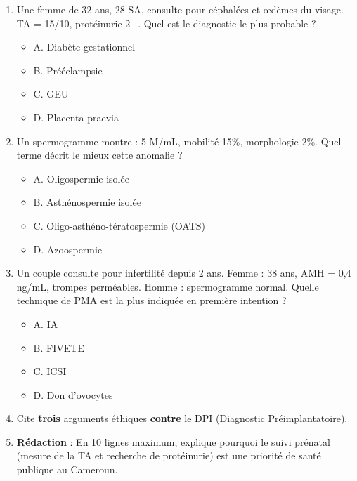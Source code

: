 \documentclass[11pt]{article}
\begin{document}
\begin{exercice}
\begin{enumerate}
\item Une femme de 32 ans, 28 SA, consulte pour céphalées et œdèmes du visage. TA = 15/10, protéinurie 2+. Quel est le diagnostic le plus probable ?
      \begin{itemize}
      \item A. Diabète gestationnel \item B. Prééclampsie \item C. GEU \item D. Placenta praevia
      \end{itemize}
\item Un spermogramme montre : 5 M/mL, mobilité 15\%, morphologie 2\%. Quel terme décrit le mieux cette anomalie ?
      \begin{itemize}
      \item A. Oligospermie isolée \item B. Asthénospermie isolée \item C. Oligo-asthéno-tératospermie (OATS) \item D. Azoospermie
      \end{itemize}
\item Un couple consulte pour infertilité depuis 2 ans. Femme : 38 ans, AMH = 0,4 ng/mL, trompes perméables. Homme : spermogramme normal. Quelle technique de PMA est la plus indiquée en première intention ?
      \begin{itemize}
      \item A. IA \item B. FIVETE \item C. ICSI \item D. Don d'ovocytes
      \end{itemize}
\item Cite \textbf{trois} arguments éthiques \textbf{contre} le DPI (Diagnostic Préimplantatoire).
\item \textbf{Rédaction} : En 10 lignes maximum, explique pourquoi le suivi prénatal (mesure de la TA et recherche de protéinurie) est une priorité de santé publique au Cameroun.
\end{enumerate}
\end{exercice}
\end{document}
